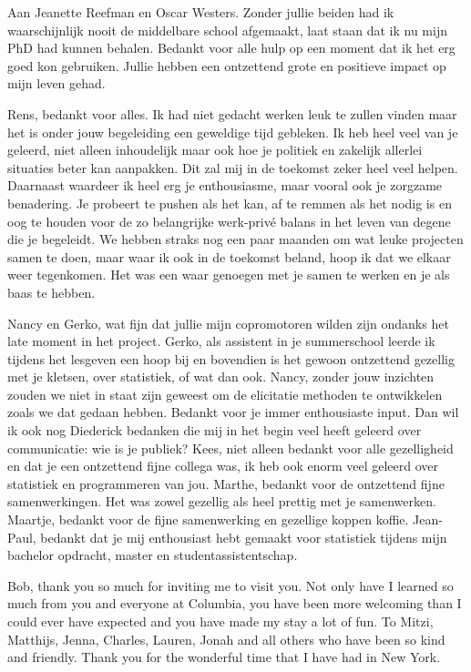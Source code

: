 \documentclass[openright,titlepage,12pt,a4paper]{book}
\begin{document}
Aan Jeanette Reefman en Oscar Westers. Zonder jullie beiden had ik waarschijnlijk nooit de middelbare school afgemaakt, laat staan dat ik nu mijn PhD had kunnen behalen. Bedankt voor alle hulp op een moment dat ik het erg goed kon gebruiken. Jullie hebben een ontzettend grote en positieve impact op mijn leven gehad.

Rens, bedankt voor alles. Ik had niet gedacht werken leuk te zullen vinden maar het is onder jouw begeleiding een geweldige tijd gebleken. Ik heb heel veel van je geleerd, niet alleen inhoudelijk maar ook hoe je politiek en zakelijk allerlei situaties beter kan aanpakken. Dit zal mij in de toekomst zeker heel veel helpen. Daarnaast waardeer ik heel erg je enthousiasme, maar vooral ook je zorgzame benadering. Je probeert te pushen als het kan, af te remmen als het nodig is en oog te houden voor de zo belangrijke werk-privé balans in het leven van degene die je begeleidt. We hebben straks nog een paar maanden om wat leuke projecten samen te doen, maar waar ik ook in de toekomst beland, hoop ik dat we elkaar weer tegenkomen. Het was een waar genoegen met je samen te werken en je als baas te hebben.

Nancy en Gerko, wat fijn dat jullie mijn copromotoren wilden zijn ondanks het late moment in het project. Gerko, als assistent in je summerschool leerde ik tijdens het lesgeven een hoop bij en bovendien is het gewoon ontzettend gezellig met je kletsen, over statistiek, of wat dan ook. Nancy, zonder jouw inzichten zouden we niet in staat zijn geweest om de elicitatie methoden te ontwikkelen zoals we dat gedaan hebben. Bedankt voor je immer enthousiaste input. Dan wil ik ook nog Diederick bedanken die mij in het begin veel heeft geleerd over communicatie: wie is je publiek? Kees, niet alleen bedankt voor alle gezelligheid en dat je een ontzettend fijne collega was, ik heb ook enorm veel geleerd over statistiek en programmeren van jou. Marthe, bedankt voor de ontzettend fijne samenwerkingen. Het was zowel gezellig als heel prettig met je samenwerken. Maartje, bedankt voor de fijne samenwerking en gezellige koppen koffie. Jean-Paul, bedankt dat je mij enthousiast hebt gemaakt voor statistiek tijdens mijn bachelor opdracht, master en studentassistentschap.

\newpage

Bob, thank you so much for inviting me to visit you. Not only have I learned so much from you and everyone at Columbia, you have been more welcoming than I could ever have expected and you have made my stay a lot of fun. To Mitzi, Matthijs, Jenna, Charles, Lauren, Jonah and all others who have been so kind and friendly. Thank you for the wonderful time that I have had in New York.
\end{document}
